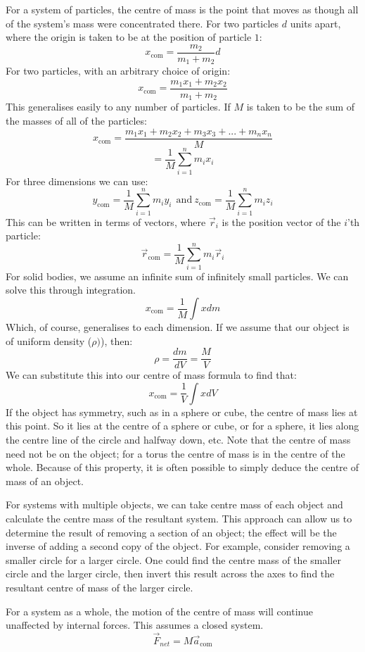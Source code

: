 \documentclass[12pt]{report}
\begin{document}
\begin{flushleft}
\bigskip
For a system of particles, the centre of mass is the point that moves as 
though all of the system's mass were concentrated there. For two particles 
\(d\) units apart, where the origin is taken to be at the position of particle
\(1\):
\[x_\mathrm{com} = \frac{m_2}{m_1 + m_2}d\]
For two particles, with an arbitrary choice of origin:
\[x_\mathrm{com} = \frac{m_1x_1 + m_2x_2}{m_1 + m_2}\]
This generalises easily to any number of particles. If \(M\) is taken to be the
sum of the masses of all of the particles:
\[x_\mathrm{com} = \frac{m_1x_1 + m_2x_2 + m_3x_3 + ... + m_nx_n}{M}\]
\[= \frac{1}{M}\sum^n_{i = 1}m_ix_i\]
For three dimensions we can use:
\[y_\mathrm{com} = \frac{1}{M}\sum^n_{i = 1}m_iy_i\ \:\mathrm{and}\: 
z_\mathrm{com} = \frac{1}{M}\sum^n_{i = 1}m_iz_i\]
This can be written in terms of vectors, where \(\vec{r}_i\) is the position 
vector of the \(i\)'th particle:
\[\vec{r}_\mathrm{com} = \frac{1}{M}\sum^n_{i = 1}m_i\vec{r}_i\]
For solid bodies, we assume an infinite sum of infinitely small particles. We
can solve this through integration.
\[x_\mathrm{com} = \frac{1}{M}\int x dm\]
Which, of course, generalises to each dimension. If we assume that our object 
is of uniform density (\(\rho)\)), then:
\[\rho = \frac{dm}{dV} = \frac{M}{V}\]
We can substitute this into our centre of mass formula to find that:
\[x_\mathrm{com} = \frac{1}{V}\int x dV\]
If the object has symmetry, such as in a sphere or cube, the centre of mass
lies at this point. So it lies at the centre of a sphere or cube, or for a 
sphere, it lies along the centre line of the circle and halfway down, etc. Note
that the centre of mass need not be on the object; for a torus the centre of 
mass is in the centre of the whole. Because of this property, it is often 
possible to simply deduce the centre of mass of an object.

\bigskip
For systems with multiple objects, we can take centre mass of each object and
calculate the centre mass of the resultant system. This approach can allow us
to determine the result of removing a section of an object; the effect will be
the inverse of adding a second copy of the object. For example, consider 
removing a smaller circle for a larger circle. One could find the centre mass
of the smaller circle and the larger circle, then invert this result across the
axes to find the resultant centre of mass of the larger circle.

\bigskip
For a system as a whole, the motion of the centre of mass will continue 
unaffected by internal forces. This assumes a closed system.
\[\vec{F}_{net} = M\vec{a}_\mathrm{com}\]


\end{flushleft}
\end{document}
